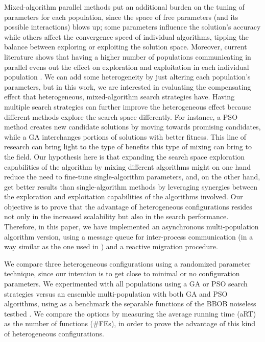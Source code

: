 \documentclass[runningheads]{llncs}
\begin{document}
Mixed-algorithm parallel methods put an
additional burden on the tuning of parameters for each population,
since the space of free parameters (and its possible interactions)
blows up; some
parameters influence the solution's accuracy while others affect the convergence
speed of individual algorithms, tipping the balance between exploring or
exploiting the solution space. Moreover, current literature shows that
having a higher number of populations communicating in parallel
evens out the effect on exploration and exploitation in each individual population
\cite{li2016multi,tanabe2013evaluation}. We can add some heterogeneity 
by just altering each population's parameters, but in this work,
we are interested in evaluating the compensating effect that
heterogeneous, mixed-algorithm search strategies have. 
Having multiple search strategies can further improve the heterogeneous effect
because different methods explore the search space differently. For instance, a
PSO method creates new candidate solutions by moving towards promising
candidates, while a GA interchanges portions of solutions with better fitness.
This line of research can bring light to the type of benefits this type of
mixing can bring to the field.
Our hypothesis here is that expanding the search space exploration
capabilities of the algorithm by mixing different algorithms might on
one hand reduce the need to fine-tune single-algorithm parameters,
and, on the other hand, get better results than single-algorithm
methods by leveraging synergies between the exploration and
exploitation capabilities of the algorithms involved. Our objective is to prove that
the advantage of heterogeneous configurations resides not only in the increased
scalability but also in the search performance.
Therefore, in this paper, we  have implemented an asynchronous
multi-population algorithm version, using a message queue for inter-process
communication (in a way similar as the one used in
\cite{guervos2018introducing}) and a reactive migration procedure.

We compare three heterogeneous configurations using a randomized
parameter technique, since our intention is to get close to minimal or
no configuration parameters.  We experimented with all populations
using a GA or PSO search strategies versus an ensemble
multi-population with both GA and PSO algorithms, using as a benchmark
the separable functions of the BBOB noiseless testbed
\cite{hansen2009real}. We compare the options by measuring the average
running time (aRT) as the number of functions (\#FEs), in order to
prove the advantage of this kind of heterogeneous configurations.
\end{document}
